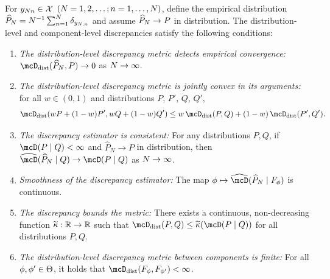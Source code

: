 \begin{assumption} 	\label{assump:metric-discr-conditions}
	For $y_{N n} \in \mathcal{X}$ $(N = 1,2,\dots; n = 1,\dots,N)$,
	define the empirical distribution $\widehat{P}_{N} = N^{-1}\sum_{n=1}^{N}\delta_{y_{N,n}}$
	and assume $\widehat{P}_{N} \rightarrow P$ in distribution.
	The distribution-level and component-level discrepancies satisfy the following conditions:
	\begin{enumerate}[label=\textnormal{(\alph*)}]
		\item \emph{The distribution-level discrepancy metric detects empirical convergence:} $\distDisc(\widehat{P}_\numobs, P) \to 0$ as $N \to \infty$.
		\item  \emph{The distribution-level discrepancy metric is jointly convex in its arguments:} for all $w \in (0, 1)$ and distributions $P$, $P'$, $Q$, $Q'$,
		      \[
			      \distDisc(wP + (1 - w)P', wQ + (1 - w)Q') \le w\,\distDisc(P, Q) + (1 - w)\,\distDisc(P', Q').
		      \]
		\item  \emph{The discrepancy estimator is consistent:} For any distributions $P, Q$,
		      if $\discr{P}{Q} < \infty$ and $\widehat P_{N} \to P$ in distribution,
		      then $\discrest{\widehat{P}_{\numobs}}{Q} \to \discr{P}{Q}$ as $N \to \infty$.
		\item \emph{Smoothness of the discrepancy estimator:} The map $\param \mapsto \discrest{\widehat{P}_{\numobs}}{F_{\param}}$ is continuous.
		\item  \emph{The discrepancy bounds the metric:} There exists a continuous,
		      non-decreasing function $\widetilde{\kappa}: \mathbb{R} \to \mathbb{R}$ such that
		      $\distDisc(P,Q) \leq \widetilde{\kappa}(\discr{P}{Q})$ for all distributions $P, Q$.
		\item \emph{The distribution-level discrepancy metric between components is finite:} For all $\phi, \phi' \in \Theta$,
		      it holds that $\distDisc(F_{\param}, F_{\param'}) < \infty$.
	\end{enumerate}
\end{assumption}


